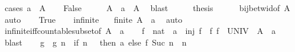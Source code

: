 \begin{isabellebody}
%
\isadelimproof
%
\endisadelimproof
%
\isatagproof
{}\isamarkupfalse%
\ {\isacharparenleft}{\kern0pt}cases\ {\isachardoublequoteopen}a\ {\isasymin}\ A{\isachardoublequoteclose}{\isacharparenright}{\kern0pt}\isanewline
\ \ \isamarkupfalse%
\ False\isanewline
\ \ \isamarkupfalse%
\ \isamarkupfalse%
\ {\isachardoublequoteopen}A\ {\isacharminus}{\kern0pt}\ {\isacharbraceleft}{\kern0pt}a{\isacharbraceright}{\kern0pt}\ {\isacharequal}{\kern0pt}\ A{\isachardoublequoteclose}\ \isamarkupfalse%
\ blast\isanewline
\ \ \isamarkupfalse%
\ \isamarkupfalse%
\ {\isacharquery}{\kern0pt}thesis\isanewline
\ \ \ \ \isamarkupfalse%
\ bij{\isacharunderscore}{\kern0pt}betw{\isacharunderscore}{\kern0pt}id{\isacharbrackleft}{\kern0pt}of\ A{\isacharbrackright}{\kern0pt}\ \isamarkupfalse%
\ auto\isanewline
{}\isamarkupfalse%
\isanewline
\ \ \isamarkupfalse%
\ True\isanewline
\ \ \isamarkupfalse%
\ infinite\ \isamarkupfalse%
\ {\isachardoublequoteopen}{\isasymnot}\ finite\ {\isacharparenleft}{\kern0pt}A\ {\isacharminus}{\kern0pt}\ {\isacharbraceleft}{\kern0pt}a{\isacharbraceright}{\kern0pt}{\isacharparenright}{\kern0pt}{\isachardoublequoteclose}\ \isamarkupfalse%
\ auto\isanewline
\ \ \isamarkupfalse%
\ infinite{\isacharunderscore}{\kern0pt}iff{\isacharunderscore}{\kern0pt}countable{\isacharunderscore}{\kern0pt}subset{\isacharbrackleft}{\kern0pt}of\ {\isachardoublequoteopen}A\ {\isacharminus}{\kern0pt}\ {\isacharbraceleft}{\kern0pt}a{\isacharbraceright}{\kern0pt}{\isachardoublequoteclose}{\isacharbrackright}{\kern0pt}\isanewline
\ \ \isamarkupfalse%
\ f\ {\isacharcolon}{\kern0pt}{\isacharcolon}{\kern0pt}\ {\isachardoublequoteopen}nat\ {\isasymRightarrow}\ {\isacharprime}{\kern0pt}a{\isachardoublequoteclose}\ \ {\isachardoublequoteopen}inj\ f{\isachardoublequoteclose}\ \ f{\isacharcolon}{\kern0pt}\ {\isachardoublequoteopen}f\ {\isacharbackquote}{\kern0pt}\ UNIV\ {\isasymsubseteq}\ A\ {\isacharminus}{\kern0pt}\ {\isacharbraceleft}{\kern0pt}a{\isacharbraceright}{\kern0pt}{\isachardoublequoteclose}\ \isamarkupfalse%
\ blast\isanewline
\ \ \isamarkupfalse%
\ g\ \ {\isachardoublequoteopen}g\ n\ {\isacharequal}{\kern0pt}\ {\isacharparenleft}{\kern0pt}if\ n\ {\isacharequal}{\kern0pt}\ {}\ then\ a\ else\ f\ {\isacharparenleft}{\kern0pt}Suc\ n{\isacharparenright}{\kern0pt}{\isacharparenright}{\kern0pt}{\isachardoublequoteclose}\ \ n\isanewline

\end{isabellebody}
